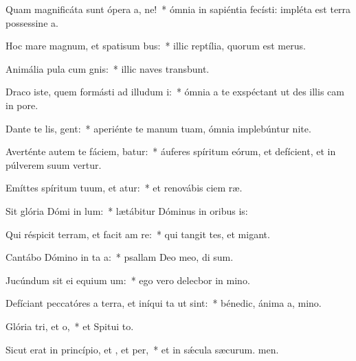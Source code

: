 \item Quam magnificáta sunt ópera a, ne!~* ómnia in sapiéntia fecísti: impléta est terra possessine a.
\item Hoc mare magnum, et spatisum bus:~* illic reptília, quorum  est merus.
\item Animália pula cum gnis:~* illic naves transbunt.
\item Draco iste, quem formásti ad illudum i:~* ómnia a te exspéctant ut des illis cam in pore.
\item Dante te lis, gent:~* aperiénte te manum tuam, ómnia implebúntur nite.
\item Averténte autem te fáciem, batur:~* áuferes spíritum eórum, et defícient, et in púlverem suum vertur.
\item Emíttes spíritum tuum, et atur:~* et renovábis ciem ræ.
\item Sit glória Dómi in lum:~* lætábitur Dóminus in oribus is:
\item Qui réspicit terram, et facit am re:~* qui tangit tes, et migant.
\item Cantábo Dómino in ta a:~* psallam Deo meo, di sum.
\item Jucúndum sit ei equium um:~* ego vero delecbor in mino.
\item Defíciant peccatóres a terra, et iníqui ta ut  sint:~* bénedic, ánima a, mino.
\item Glória tri, et o,~* et Spitui to.
\item Sicut erat in princípio, et , et per,~* et in sǽcula sæcurum. men.
